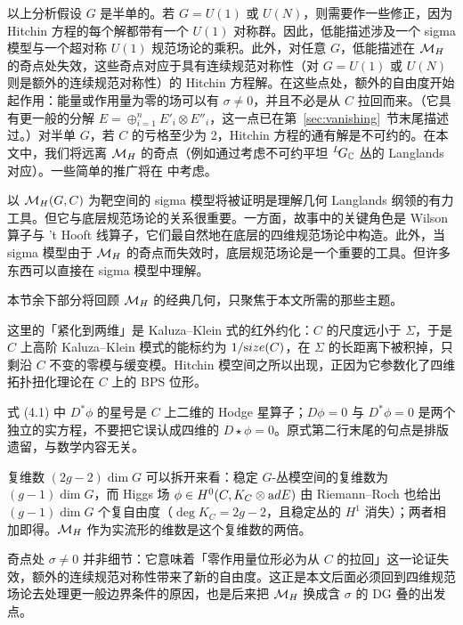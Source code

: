 以上分析假设 $G$ 是半单的。若 $G=U(1)$ 或 $U(N)$，则需要作一些修正，因为 Hitchin 方程的每个解都带有一个 $U(1)$ 对称群。因此，低能描述涉及一个 sigma 模型与一个超对称 $U(1)$ 规范场论的乘积。此外，对任意 $G$，低能描述在 $\M_H$ 的奇点处失效，这些奇点对应于具有连续规范对称性（对 $G=U(1)$ 或 $U(N)$ 则是额外的连续规范对称性）的 Hitchin 方程解。在这些点处，额外的自由度开始起作用：能量或作用量为零的场可以有 $\sigma\not=0$，并且不必是从 $C$ 拉回而来。（它具有更一般的分解 $E=\oplus_{i=1}^nE'_i\otimes E''_i$，这一点已在第~\ref{sec:vanishing}~节末尾描述过。）对半单 $G$，若 $C$ 的亏格至少为 2，Hitchin 方程的通有解是不可约的。在本文中，我们将远离 $\M_H$ 的奇点（例如通过考虑不可约平坦 $^L\negthinspace G_{\Bbb{C}}$ 丛的 Langlands 对应）。一些简单的推广将在 \cite{ref26} 中考虑。

以 $\MH(G,C)$ 为靶空间的 sigma 模型将被证明是理解几何 Langlands 纲领的有力工具。但它与底层规范场论的关系很重要。一方面，故事中的关键角色是 Wilson 算子与 't Hooft 线算子，它们最自然地在底层的四维规范场论中构造。此外，当 sigma 模型由于 $\MH$ 的奇点而失效时，底层规范场论是一个重要的工具。但许多东西可以直接在 sigma 模型中理解。

本节余下部分将回顾 $\MH$ 的经典几何，只聚焦于本文所需的那些主题。

\begin{yizhu}[物理图像]
这里的「紧化到两维」是 Kaluza--Klein 式的红外约化：$C$ 的尺度远小于 $\Sigma$，于是 $C$ 上高阶 Kaluza--Klein 模式的能标约为 $1/{\rm size}(C)$，在 $\Sigma$ 的长距离下被积掉，只剩沿 $C$ 不变的零模与缓变模。Hitchin 模空间之所以出现，正因为它参数化了四维拓扑扭化理论在 $C$ 上的 BPS 位形。
\end{yizhu}

\begin{yizhu}[易错点]
式 (4.1) 中 $D^*\phi$ 的星号是 $C$ 上二维的 Hodge 星算子；$D\phi=0$ 与 $D^*\phi=0$ 是两个独立的实方程，不要把它误认成四维的 $D\star\phi=0$。原式第二行末尾的句点是排版遗留，与数学内容无关。
\end{yizhu}

\begin{yizhu}[含糊点拨]
复维数 $(2g-2)\dim G$ 可以拆开来看：稳定 $G$-丛模空间的复维数为 $(g-1)\dim G$，而 Higgs 场 $\phi\in H^0(C,K_C\otimes{\rm ad}E)$ 由 Riemann--Roch 也给出 $(g-1)\dim G$ 个复自由度（$\deg K_C=2g-2$，且稳定丛的 $H^1$ 消失）；两者相加即得。$\MH$ 作为实流形的维数是这个复维数的两倍。
\end{yizhu}

\begin{yizhu}[物理图像]
奇点处 $\sigma\not=0$ 并非细节：它意味着「零作用量位形必为从 $C$ 的拉回」这一论证失效，额外的连续规范对称性带来了新的自由度。这正是本文后面必须回到四维规范场论去处理更一般边界条件的原因，也是后来把 $\MH$ 换成含 $\sigma$ 的 DG 叠的出发点。
\end{yizhu}
